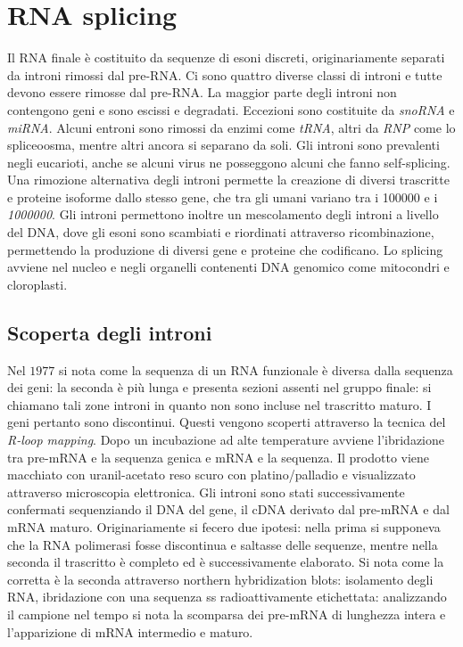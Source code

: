 \section{RNA splicing}
Il RNA finale \`e costituito da sequenze di esoni discreti, originariamente separati da introni rimossi dal pre-RNA. Ci sono quattro diverse classi di introni e tutte devono essere
rimosse dal pre-RNA. La maggior parte degli introni non contengono geni e sono escissi e degradati. Eccezioni sono costituite da \emph{snoRNA} e \emph{miRNA}. Alcuni entroni sono
rimossi da enzimi come \emph{tRNA}, altri da \emph{RNP} come lo spliceoosma, mentre altri ancora si separano da soli. Gli introni sono prevalenti negli eucarioti, anche se alcuni virus
ne posseggono alcuni che fanno self-splicing. Una rimozione alternativa degli introni permette la creazione di diversi trascritte e proteine isoforme dallo stesso gene, che tra gli
umani variano tra i \num{100000} e i \emph{1000000}. Gli introni permettono inoltre un mescolamento degli introni a livello del DNA, dove gli esoni sono scambiati e riordinati attraverso
ricombinazione, permettendo la produzione di diversi gene e proteine che codificano. Lo splicing avviene nel nucleo e negli organelli contenenti DNA genomico come mitocondri e 
cloroplasti.
\subsection{Scoperta degli introni}
Nel $1977$ si nota come la sequenza di un RNA funzionale \`e diversa dalla sequenza dei geni: la seconda \`e pi\`u lunga e presenta sezioni assenti nel gruppo finale: si chiamano 
tali zone introni in quanto non sono incluse nel trascritto maturo. I geni pertanto sono discontinui. Questi vengono scoperti attraverso la tecnica del \emph{R-loop mapping}. Dopo 
un incubazione ad alte temperature avviene l'ibridazione tra pre-mRNA e la sequenza genica e mRNA e la sequenza. Il prodotto viene macchiato con uranil-acetato reso scuro con
platino/palladio e visualizzato attraverso microscopia elettronica. Gli introni sono stati successivamente confermati sequenziando il DNA del gene, il cDNA derivato dal pre-mRNA e dal
mRNA maturo. Originariamente si fecero due ipotesi: nella prima si supponeva che la RNA polimerasi fosse discontinua e saltasse delle sequenze, mentre nella seconda il trascritto 
\`e completo ed \`e successivamente elaborato. Si nota come la corretta \`e la seconda attraverso northern hybridization blots: isolamento degli RNA, ibridazione con una sequenza
ss radioattivamente etichettata: analizzando il campione nel tempo si nota la scomparsa dei pre-mRNA di lunghezza intera e l'apparizione di mRNA intermedio e maturo. 

